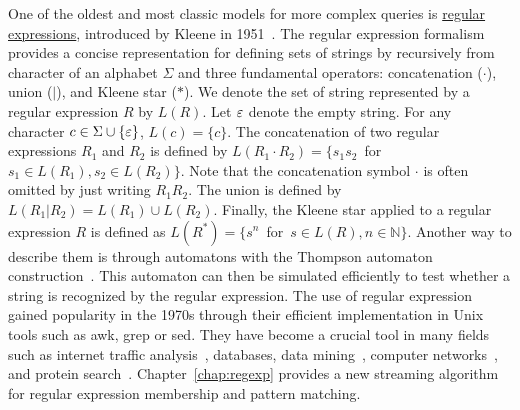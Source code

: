 One of the oldest and most classic models for more complex queries is \underline{regular expressions}, introduced by Kleene in 1951~\cite{RM-704}.
The regular expression formalism provides a concise representation for defining sets of strings by recursively from character of an alphabet $\Sigma$ and three fundamental operators: concatenation ($\cdot$), union ($|$), and Kleene star ($\ast$).
We denote the set of string represented by a regular expression $R$ by $L(R)$. Let $\varepsilon$ denote the empty string.
For any character $c \in \Sigma \cup \{\varepsilon\}$, $L(c) = \{c\}$.
The concatenation of two regular expressions $R_1$ and $R_2$ is defined by $L(R_1 \cdot R_2) = \{s_1s_2$~for~$s_1 \in L(R_1), s_2 \in L(R_2)\}$. Note that the concatenation symbol $\cdot$ is often omitted by just writing $R_1R_2$.
The union is defined by $L(R_1 | R_2) = L(R_1) \cup L(R_2)$.
Finally, the Kleene star applied to a regular expression $R$ is defined as $L(R^\ast)=\{s^n$~for~$s \in L(R), n \in \mathbb{N} \}$.
Another way to describe them is through automatons with the Thompson automaton construction~\cite{Thompson_automaton}. This automaton can then be simulated efficiently to test whether a string is recognized by the regular expression.
The use of regular expression gained popularity in the 1970s through their efficient implementation in Unix tools such as awk, grep or sed.
They have become a crucial tool in many fields such as internet traffic analysis~\cite{4221791,4579527}, databases, data mining~\cite{1000341,10.5555/645927.672035,10.1145/375551.375569}, computer networks~\cite{10.1145/1159913.1159952}, and protein search~\cite{10.1145/369133.369220}.
Chapter~\ref{chap:regexp} provides a new streaming algorithm for regular expression membership and pattern matching.


